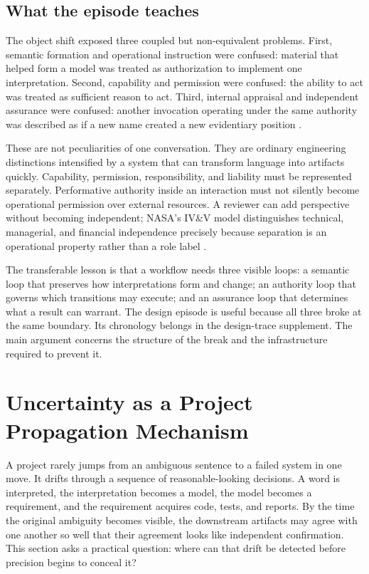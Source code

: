 \documentclass[10pt,a4paper]{article}
\begin{document}
\subsection{What the episode teaches}

The object shift exposed three coupled but non-equivalent problems. First, semantic formation and operational instruction were confused: material that helped form a model was treated as authorization to implement one interpretation. Second, capability and permission were confused: the ability to act was treated as sufficient reason to act. Third, internal appraisal and independent assurance were confused: another invocation operating under the same authority was described as if a new name created a new evidentiary position \cite{sessionrecord,caseevidence}.

These are not peculiarities of one conversation. They are ordinary engineering distinctions intensified by a system that can transform language into artifacts quickly. Capability, permission, responsibility, and liability must be represented separately. Performative authority inside an interaction must not silently become operational permission over external resources. A reviewer can add perspective without becoming independent; NASA's IV\&V model distinguishes technical, managerial, and financial independence precisely because separation is an operational property rather than a role label \cite{nasa8739}.

The transferable lesson is that a workflow needs three visible loops: a semantic loop that preserves how interpretations form and change; an authority loop that governs which transitions may execute; and an assurance loop that determines what a result can warrant. The design episode is useful because all three broke at the same boundary. Its chronology belongs in the design-trace supplement. The main argument concerns the structure of the break and the infrastructure required to prevent it.

\section{Uncertainty as a Project Propagation Mechanism}

A project rarely jumps from an ambiguous sentence to a failed system in one move. It drifts through a sequence of reasonable-looking decisions. A word is interpreted, the interpretation becomes a model, the model becomes a requirement, and the requirement acquires code, tests, and reports. By the time the original ambiguity becomes visible, the downstream artifacts may agree with one another so well that their agreement looks like independent confirmation. This section asks a practical question: where can that drift be detected before precision begins to conceal it?
\end{document}
